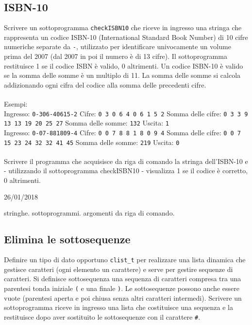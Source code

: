 \subsection{ISBN-10}
Scrivere un sottoprogramma \texttt{checkISBN10} che riceve in ingresso una stringa che rappresenta un codice ISBN-10 (International Standard Book Number) di 10 cifre numeriche separate da \texttt{-}, utilizzato per identificare univocamente un volume prima del 2007 (dal 2007 in poi il numero \`e di 13 cifre). Il sottoprogramma restituisce 1 se il codice ISBN \`e valido, 0 altrimenti.
Un codice ISBN-10 \`e valido se la somma delle somme \`e un multiplo di 11. La somma delle somme si calcola addizionando ogni cifra del codice alla somma delle precedenti cifre.
\\ \\
Esempi:
\\
Ingresso: \texttt{0-306-40615-2}
Cifre: \texttt{0 3 0 6 4 0 6 1 5 2}
Somma delle cifre: \texttt{0 3 3 9 13 13 19 20 25 27}
Somma delle somme: \texttt{132}
Uscita: \texttt{1}
\\
Ingresso: \texttt{0-07-881809-4}
Cifre: \texttt{0 0 7 8 8 1 8 0 9 4}
Somma delle cifre: \texttt{0 0 7 15 23 24 32 32 41 45}
Somma delle somme: \texttt{219}
Uscita: \texttt{0}
\\ \\
Scrivere il programma che acquisisce da riga di comando la stringa dell’ISBN-10 e - utilizzando il sottoprogramma checkISBN10 - visualizza 1 se il codice \`e corretto, 0 altrimenti.

\begin{esame}
26/01/2018
\end{esame}

\begin{tags}
stringhe. sottoprogrammi. argomenti da riga di comando.
\end{tags}



\subsection{Elimina le sottosequenze}
Definire un tipo di dato opportuno \texttt{clist\_t} per realizzare una lista dinamica che gestisce caratteri (ogni elemento un carattere) e serve per gestire sequenze di caratteri. Si definisce sottosequenza una sequenza di caratteri compresa tra una parentesi tonda iniziale \texttt{(} e una finale \texttt{)}.
Le sottosequenze possono anche essere vuote (parentesi aperta e poi chiusa senza altri caratteri intermedi). 
Scrivere un sottoprogramma riceve in ingresso una lista che costituisce una sequenza e la restituisce dopo aver sostituito le sottosequenze con il carattere \texttt{\#}.


